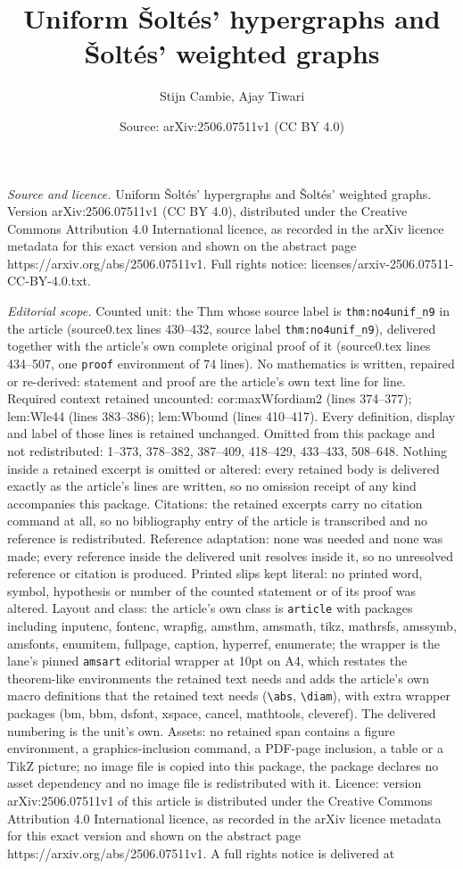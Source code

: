 \documentclass[10pt,a4paper]{amsart}
\title[Uniform \v{S}olt\'es' hypergraphs and \v{S}olt\'es' weighted]{Uniform \v{S}olt\'es' hypergraphs and \v{S}olt\'es' weighted graphs}
\author{Stijn Cambie, Ajay Tiwari}
\date{Source: arXiv:2506.07511v1 (CC BY 4.0)}
\begin{document}
\maketitle

\noindent\emph{Source and licence.} Uniform \v{S}olt\'es' hypergraphs and \v{S}olt\'es' weighted graphs. Version arXiv:2506.07511v1 (CC BY 4.0), distributed under the Creative Commons Attribution 4.0 International licence, as recorded in the arXiv licence metadata for this exact version and shown on the abstract page https://arxiv.org/abs/2506.07511v1. Full rights notice: licenses/arxiv-2506.07511-CC-BY-4.0.txt.\par\smallskip

\noindent\textit{Editorial scope.} Counted unit: the Thm whose source label is \texttt{thm:no4unif\_n9} in the article (source0.tex lines 430--432, source label \texttt{thm:no4unif\_n9}), delivered together with the article's own complete original proof of it (source0.tex lines 434--507, one \texttt{proof} environment of 74 lines). No mathematics is written, repaired or re-derived: statement and proof are the article's own text line for line. Required context retained uncounted: cor:maxWfordiam2 (lines 374--377); lem:Wle44 (lines 383--386); lem:Wbound (lines 410--417). Every definition, display and label of those lines is retained unchanged. Omitted from this package and not redistributed: 1--373, 378--382, 387--409, 418--429, 433--433, 508--648. Nothing inside a retained excerpt is omitted or altered: every retained body is delivered exactly as the article's lines are written, so no omission receipt of any kind accompanies this package. Citations: the retained excerpts carry no citation command at all, so no bibliography entry of the article is transcribed and no reference is redistributed. Reference adaptation: none was needed and none was made; every reference inside the delivered unit resolves inside it, so no unresolved reference or citation is produced. Printed slips kept literal: no printed word, symbol, hypothesis or number of the counted statement or of its proof was altered. Layout and class: the article's own class is \texttt{article} with packages including inputenc, fontenc, wrapfig, amsthm, amsmath, tikz, mathrsfs, amssymb, amsfonts, enumitem, fullpage, caption, hyperref, enumerate; the wrapper is the lane's pinned \texttt{amsart} editorial wrapper at 10pt on A4, which restates the theorem-like environments the retained text needs and adds the article's own macro definitions that the retained text needs (\texttt{\textbackslash abs}, \texttt{\textbackslash diam}), with extra wrapper packages (bm, bbm, dsfont, xspace, cancel, mathtools, cleveref). The delivered numbering is the unit's own. Assets: no retained span contains a figure environment, a graphics-inclusion command, a PDF-page inclusion, a table or a TikZ picture; no image file is copied into this package, the package declares no asset dependency and no image file is redistributed with it. Licence: version arXiv:2506.07511v1 of this article is distributed under the Creative Commons Attribution 4.0 International licence, as recorded in the arXiv licence metadata for this exact version and shown on the abstract page https://arxiv.org/abs/2506.07511v1. A full rights notice is delivered at 
\end{document}
